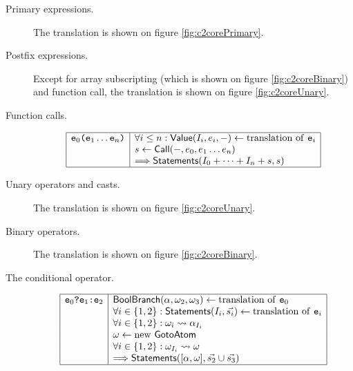 \begin{docpart}
\begin{description}
\item[Primary expressions.] The translation is shown on figure
        \vref{fig:c2corePrimary}.
\item[Postfix expressions.] Except for array subscripting (which is
        shown on figure \vref{fig:c2coreBinary}) and function
        call, the translation is shown on figure
        \vref{fig:c2coreUnary}.
\item[Function calls.]
        \begin{displaymath}\begin{array}{|l|l|}
        \hline
        \texttt{e}_0\texttt{(e}_1\ldots\texttt{e}_n\texttt{)} &
          \forall i \leq n: \textsf{Value}(I_i,e_i,-) <-
                \mbox{translation of \texttt{e}}_i \\
        & s <- \textsf{Call}(-,e_0,e_1\ldots e_n) \\
        & ==> \textsf{Statements}(I_0 + \cdots + I_n + s,s) \\
        \hline
        \end{array}\end{displaymath}
\item[Unary operators and casts.] The translation is shown on figure
        \vref{fig:c2coreUnary}.
\item[Binary operators.] The translation is shown on figure
        \vref{fig:c2coreBinary}.
\item[The conditional operator.]
        \begin{displaymath}\begin{array}{|l|l|}
        \hline
        \texttt{e}_0\texttt{?e}_1\texttt{:e}_2 &
          \textsf{BoolBranch}(\alpha,\omega_2,\omega_3) <-
                \mbox{translation of \texttt{e}}_0 \\
        & \forall i \in \{1,2\}: \textsf{Statements}(I_i,\vec{s_i}) <-
                \mbox{translation of \texttt{e}}_i \\
        & \forall i \in \{1,2\}: {\omega_i}\rightsquigarrow{\alpha_{I_i}} \\
        & \omega <- \mbox{new \textsf{GotoAtom}} \\
        & \forall i \in \{1,2\}: {\omega_{I_i}}\rightsquigarrow{\omega} \\
        & ==> \textsf{Statements}([\alpha,\omega],\vec{s_2}\cup\vec{s_3}) \\
        \hline
        \end{array}\end{displaymath}
\end{description}


\end{docpart}
